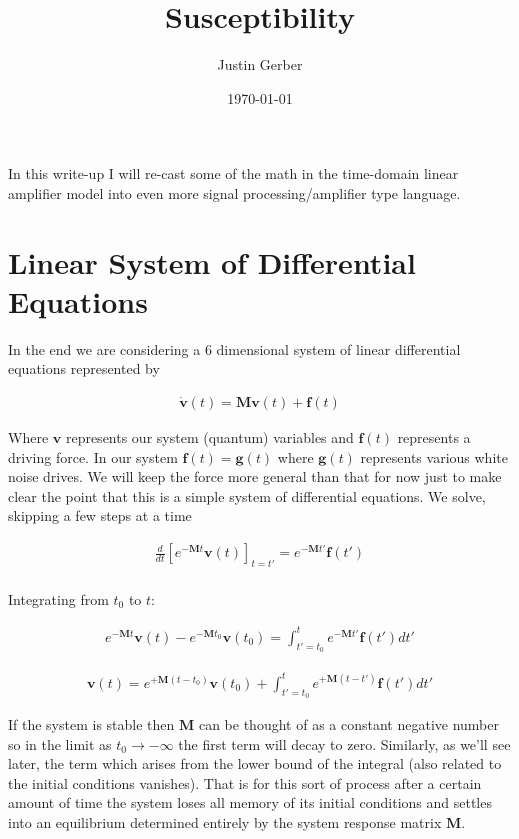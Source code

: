 \documentclass[12pt]{article}
\newcommand{\bv}[1]{\mathbf{#1}}
\begin{document}
\title{Susceptibility}
\author{Justin Gerber}
\date{\today}
\maketitle

In this write-up I will re-cast some of the math in the time-domain linear amplifier model into even more signal processing/amplifier type language.

\section*{Linear System of Differential Equations}

In the end we are considering a 6 dimensional system of linear differential equations represented by

\begin{align}
\dot{\bv{v}}(t) = \bv{M} \bv{v}(t) + \bv{f}(t)
\end{align}

Where $\bv{v}$ represents our system (quantum) variables and $\bv{f}(t)$ represents a driving force. In our system $\bv{f}(t) = \bv{g}(t)$ where $\bv{g}(t)$ represents various white noise drives. We will keep the force more general than that for now just to make clear the point that this is a simple system of differential equations. We solve, skipping a few steps at a time

\begin{align}
\frac{d}{dt}\left[e^{-\bv{M}t}\bv{v}(t)\right]_{t=t'} = e^{-\bv{M}t'}\bv{f}(t')\\
\end{align}

Integrating from $t_0$ to $t$:

\begin{align}
e^{-\bv{M}t}\bv{v}(t)-e^{-\bv{M}t_0}\bv{v}(t_0) = \int_{t'=t_0}^{t}e^{-\bv{M}t'}\bv{f}(t')dt'
\end{align}


\begin{align}
\bv{v}(t) = e^{+\bv{M}(t-t_0)}\bv{v}(t_0) + \int_{t'=t_0}^{t} e^{+\bv{M}(t-t')}\bv{f}(t') dt'
\end{align}

If the system is stable then $\bv{M}$ can be thought of as a constant negative number so in the limit as $t_0\rightarrow -\infty$ the first term will decay to zero. Similarly, as we'll see later, the term which arises from the lower bound of the integral (also related to the initial conditions vanishes). That is for this sort of process after a certain amount of time the system loses all memory of its initial conditions and settles into an equilibrium determined entirely by the system response matrix $\bv{M}$.
\end{document}
